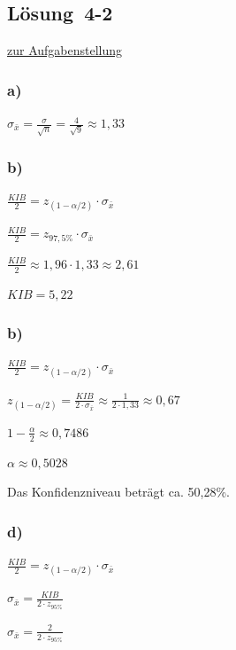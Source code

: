 \documentclass[
  11pt,
  ngerman,
  a4paper,
]{report}
\begin{document}
\hypertarget{loesung-4-2}{%
\subsection{Lösung~4-2}\label{loesung-4-2}}

\protect\hyperlink{aufgabe-4-2}{zur Aufgabenstellung}

\hypertarget{a-15}{%
\subsubsection{a)}\label{a-15}}

\(\sigma _{\bar{x}}=\frac{\sigma}{\sqrt{n}}=\frac{4}{\sqrt{9}}\approx1{,}33\)

\hypertarget{b-15}{%
\subsubsection{b)}\label{b-15}}

\(\frac{\mathit{KIB}}{2}=z_{(1-\alpha/2)} \cdot \sigma_{\bar{x}}\)

\(\frac{\mathit{KIB}}{2}= z_{97{,}5\%}\cdot \sigma_{\bar{x}}\)

\(\frac{\mathit{KIB}}{2}\approx 1{,}96 \cdot 1{,}33 \approx 2{,}61\)

\(\mathit{KIB}=5{,}22\)

\hypertarget{b-16}{%
\subsubsection{b)}\label{b-16}}

\(\frac{\mathit{KIB}}{2}=z_{(1-\alpha/2)} \cdot \sigma_{\bar{x}}\)

\(z_{(1-\alpha/2)} = \frac{\mathit{KIB}}{2 \cdot \sigma_{\bar{x}}}\approx\frac{1}{2 \cdot 1{,}33}\approx0{,}67\)

\(1-\frac{\alpha}{2} \approx 0,7486\)

\(\alpha \approx 0,5028\)

Das Konfidenzniveau beträgt ca. 50,28\%.

\hypertarget{d-6}{%
\subsubsection{d)}\label{d-6}}

\(\frac{\mathit{KIB}}{2} = z_{(1-\alpha/2)} \cdot \sigma_{\bar{x}}\)

\(\sigma_{\bar{x}} = \frac{\mathit{KIB}}{2\cdot z_{95\%}}\)

\(\sigma_{\bar{x}} = \frac{2}{2 \cdot z_{95\%}}\)
\end{document}
